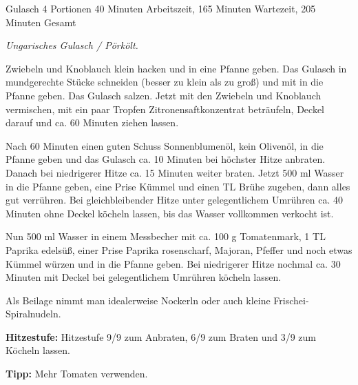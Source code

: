 \begin{recipe}{Gulasch} {4 Portionen} {40 Minuten Arbeitszeit, 165 Minuten Wartezeit, 205 Minuten Gesamt}

  \freeform{}\textit{Ungarisches Gulasch / Pörkölt.}


  Zwiebeln und Knoblauch klein hacken und in eine Pfanne geben.
  Das Gulasch in mundgerechte Stücke schneiden (besser zu klein als zu groß) und mit in die Pfanne geben.
  Das Gulasch salzen.
  Jetzt mit den Zwiebeln und Knoblauch vermischen, mit ein paar Tropfen Zitronensaftkonzentrat beträufeln, Deckel darauf und ca. 60 Minuten ziehen lassen.


  Nach 60 Minuten einen guten Schuss Sonnenblumenöl, kein Olivenöl, in die Pfanne geben und das Gulasch ca. 10 Minuten bei höchster Hitze anbraten.
  Danach bei niedrigerer Hitze ca. 15 Minuten weiter braten.
  Jetzt 500 ml Wasser in die Pfanne geben, eine Prise Kümmel und einen TL Brühe zugeben, dann alles gut verrühren.
  Bei gleichbleibender Hitze unter gelegentlichem Umrühren ca. 40 Minuten ohne Deckel köcheln lassen, bis das Wasser vollkommen verkocht ist.

  
  Nun 500 ml Wasser in einem Messbecher mit ca. 100 g Tomatenmark, 1 TL Paprika edelsüß, einer Prise Paprika rosenscharf, Majoran, Pfeffer und noch etwas Kümmel würzen und in die Pfanne geben.
  Bei niedrigerer Hitze nochmal ca. 30 Minuten mit Deckel bei gelegentlichem Umrühren köcheln lassen.

  Als Beilage nimmt man idealerweise Nockerln oder auch kleine Frischei-Spiralnudeln.

  \freeform{}\hrulefill{}

  \freeform{}\textbf{Hitzestufe:}
  Hitzestufe 9/9 zum Anbraten, 6/9 zum Braten und 3/9 zum Köcheln lassen.

  \freeform{}\textbf{Tipp:}
  Mehr Tomaten verwenden.

\end{recipe}
